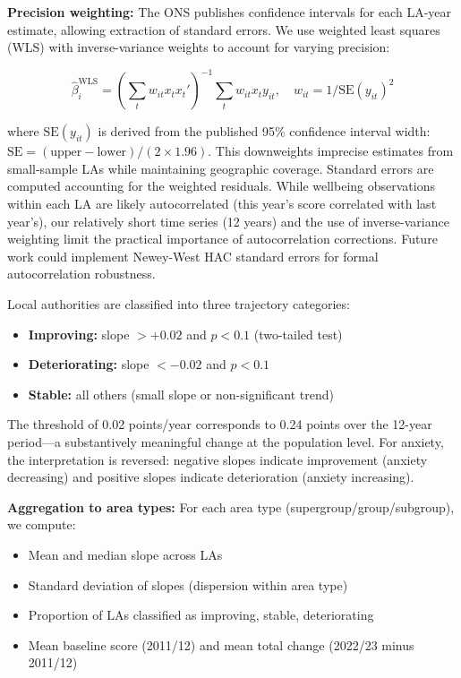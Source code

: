\documentclass[12pt,a4paper]{article}
\begin{document}
\textbf{Precision weighting:} The ONS publishes confidence intervals for each LA-year estimate, allowing extraction of standard errors. We use weighted least squares (WLS) with inverse-variance weights to account for varying precision:

\[
\hat{\beta}_i^{\text{WLS}} = \left( \sum_t w_{it} x_t x_t' \right)^{-1} \sum_t w_{it} x_t y_{it}, \quad w_{it} = 1 / \text{SE}(y_{it})^2
\]

where $\text{SE}(y_{it})$ is derived from the published 95\% confidence interval width: $\text{SE} = (\text{upper} - \text{lower}) / (2 \times 1.96)$. This downweights imprecise estimates from small-sample LAs while maintaining geographic coverage. Standard errors are computed accounting for the weighted residuals. While wellbeing observations within each LA are likely autocorrelated (this year's score correlated with last year's), our relatively short time series (12 years) and the use of inverse-variance weighting limit the practical importance of autocorrelation corrections. Future work could implement Newey-West HAC standard errors for formal autocorrelation robustness.

Local authorities are classified into three trajectory categories:
\begin{itemize}
\item \textbf{Improving:} slope $> +0.02$ and $p < 0.1$ (two-tailed test)
\item \textbf{Deteriorating:} slope $< -0.02$ and $p < 0.1$
\item \textbf{Stable:} all others (small slope or non-significant trend)
\end{itemize}

The threshold of 0.02 points/year corresponds to 0.24 points over the 12-year period---a substantively meaningful change at the population level. For anxiety, the interpretation is reversed: negative slopes indicate improvement (anxiety decreasing) and positive slopes indicate deterioration (anxiety increasing).

\textbf{Aggregation to area types:} For each area type (supergroup/group/subgroup), we compute:
\begin{itemize}
\item Mean and median slope across LAs
\item Standard deviation of slopes (dispersion within area type)
\item Proportion of LAs classified as improving, stable, deteriorating
\item Mean baseline score (2011/12) and mean total change (2022/23 minus 2011/12)
\end{itemize}
\end{document}
